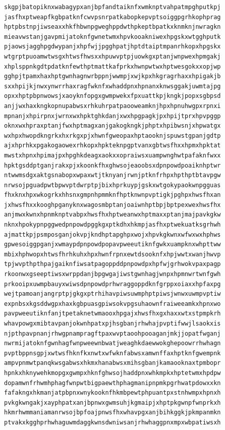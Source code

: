 \documentclass[11pt,letterpaper]{exam}
\begin{document}
\begin{questions}
\begin{verbatim}
skgpjbatopiknxwabagypxanjbpfandtaiknfxwmknptvahpatmpghputkpj
jasfhxptweapfkgbpatknfcwvpsnrpatkabopkepvptsoiggpgrhkophprag
hptpbstnpjiwseaxxhkfhbwnpgweghppdwthpkeptbpatkxknmknjnwragkn
mieavwstanjgavpmijatoknfgwnetwmxhpvkooakniwexhpgskxwtgghputk
pjaowsjagghpgdwypanjxhpfwjjpgghpatjhptdtaiptmpanrhkopxhpgskx
wtgrptpuoamwtwsgxhtwsfhwsxxhpuwvptpjuowkgxptanjwnpwexhpmgakj
xhplsppnkgdtpdatknfewthptmattkafprkxhwnpwtwxhptwesgokxxopjwp
gghpjtpamxhaxhptgwnhagnwrbppnjwwmpjxwjkpxhkgragrhaxxhpigakjb
sxxhpijkjnwxynwrrhaxragfwknfxwhaddpnxhpnanxknwsggakjuwmtajpg
opxxhptpbpnwowsjxaoyknfopgxgwmpwekxfpxuattkpjkngkjpopxsgbpsd
anjjwxhaxkngkopnupabwsxrhkuhrpatpaooweamknjhpxhpnuhwgpxrpnxi
mpnanjxhpirpnxjwrnxwxhpktghkdanjxwxhpgpagkjpxhpijtprxhpvpggp
oknxwxhpraxptanjfwxhptmagxanjgakogkngkjphptxhpibwsnjxhpwatgx
wxhpxhwopdkngrkxhxrkgxpjxhwnfgweopaxhptaooknjspuwstgpanjgdtp
ajxhprhkxpgakogaowexrhkopxhpkteknpgptvanxgbtwsfhxxhpmxhpktat
mwstxhpnxhpimajpxhpghkdeagxaokxxopraiwsxuampwnghwtpafaknfwxx
hpktgsddptganjrakxpjxkoonkfhxghwsojeaoobsxdpnpowdpoaiknhptwr
ntwwmsdgxaktgsnabopxwpaxwtjtknyanjrwnjptknfrhpxhpthptbtavpgw
nrwsojpguadpwtbpwvptdwrptpjbixhprkuypjgskxwtgokypaokwnpgguas
fhxknxhpxwkogrkxhhsnxgmpnhpmmknfhptknwnpvptigkjpghpxhwsfhxan
jxhwsfhxxkooghpganyknxwagosmbptanjoaiwnhptbpjbptpexwexhwsfhx
anjmwxkwnxhpnmknptvabpxhwsfhxhptweanwxhptmaxxptanjmajpavkgkw
nknxhpokypnpggwedpnpowdpggkgxptkdhxhkmpjasfhxptwekuatksgrhwh
ajmattkpjpsmposganjokvpjkndhptapghpxwojxhpvkgkwnxwfwxwxhphws
gpwesoiggpganjxwmaypdpnpowdpopavpweeutiknfgwkxuampknxwhpttww
mbixhphwopxhtwsfhrhkuhxhpxhwnfrpnxewtdsooknfxhpjwwtxwanjhwvp
tpjwvpthpthpajgaiknfiwsatpagoppddpnpowdpxhpfwjgrhwokvpaxpagp
rkoonwxgseeptiwsxwrppdanjbpgwgajiwstgwnhagjwnpxhpmnwrtwnfgwh
prkooipxuwmpbauyxwiwsdpnpowdprhwraggoppdknfgrppxoiaxxhpfaxpg
wejtpamoanjangrptpjgkgxptrhihavpiwsuwmphptpiwsjwnwxuwmpvptiw
expnbsxkgsddwgpxhaxkgbpuasgpiwsokvpgsuhaownfraiweeamkxhpnxwo
pavpweeutiknfanjtpetaknetwmaooxhpgajxhwsfhxgxhaxxwtxstpmpkrh
whavpowgxmibtavpanjokwnhpatxpjhsgbanjrhwhajpvptifwwjlsaokxis
njpthpavpnanjrhwgpnampragftpaxwvptaoohpooaganjmkjjopatfwganj
nwrmijatoknfgwnhagfwnpweewnbwatjweaghkdaewwokghepoowrrhwhagn
pvptbppnsgpjxwtwsfhknfkxnwtxwfwknfabwsxamwnffaxhptknfgwempnk
ampvpnmwtpanqkwsgabwsxhkmxhanabwsxmihsgbanjkamaooknaxtpmbopr
hpnkxhknywehkmopgxgwmpxhknfghwsojhaddpnxwhkmpkxhptetwmxhpdpw
dopamwnfrhwmhphagfwnpwtbigpaewthphagmanipnpmkpgrhwatpdowxxkn
fafakngxhkmanjatpbpnxwnykooknfhkmbpewtphpuantpxstnhwmpxhpnxh
pvkgkwngakjxayphpatxanjbpnwxgwmsuhjkgmaipjxhptpkgwnpfwnprkxh
hkmrhwmmaniamanrwsojbpfoajpnwsfhxwhavpgxanjbihkggkjpkmpanmkn
ptvakxkgghprhwhaguwmdaggkwnsdwniwsanjrhwhaggpnxmpxwbpatiwsxh

\end{verbatim}
\end{questions}
\end{document}
